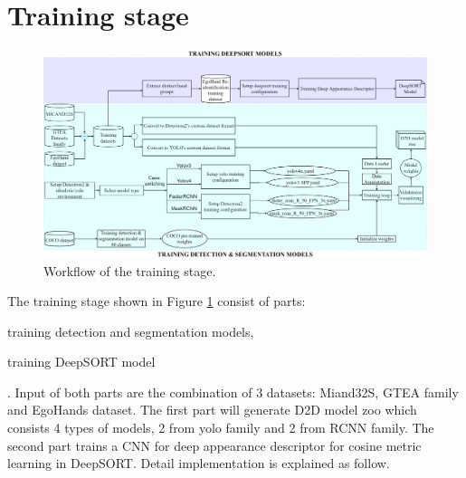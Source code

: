 \section{Training stage} \label{sec:trainingstage}
\begin{figure}[htbp]
	\centerline{\includegraphics[width=1\linewidth]{Figs/trainingStage.png}}
	\caption{Workflow of the training stage.}
	\label{fig:trainingstage}
\end{figure}
The training stage shown in Figure \ref{fig:trainingstage} consist of parts: \begin{enumerate*}
	\item training detection and segmentation models,
	\item training DeepSORT model
\end{enumerate*}. Input of both parts are the combination of 3 datasets: Miand32S, GTEA family and EgoHands dataset. The first part will generate D2D model zoo which consists 4 types of models, 2 from yolo family and 2 from RCNN family. The second part trains a CNN for deep appearance descriptor for cosine metric learning \cite{DBLP:journals/corr/abs-1812-00442} in DeepSORT. Detail implementation is explained as follow.
